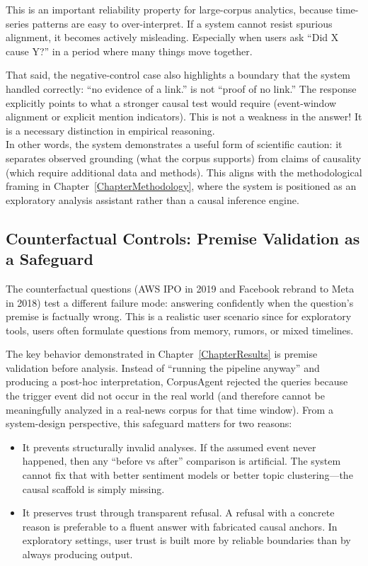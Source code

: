 This is an important reliability property for large-corpus analytics, because time-series patterns are easy to over-interpret. If a system cannot resist spurious alignment, it becomes actively misleading. Especially when users ask “Did X cause Y?” in a period where many things move together.

That said, the negative-control case also highlights a boundary that the system handled correctly: “no evidence of a link.” is not “proof of no link.” The response explicitly points to what a stronger causal test would require (event-window alignment or explicit mention indicators). This is not a weakness in the answer! It is a necessary distinction in empirical reasoning. \\
In other words, the system demonstrates a useful form of scientific caution: it separates observed grounding (what the corpus supports) from claims of causality (which require additional data and methods). This aligns with the methodological framing in Chapter~\ref{ChapterMethodology}, where the system is positioned as an exploratory analysis assistant rather than a causal inference engine.

\subsection{Counterfactual Controls: Premise Validation as a Safeguard}

The counterfactual questions (AWS IPO in 2019 and Facebook rebrand to Meta in 2018) test a different failure mode: answering confidently when the question’s premise is factually wrong. This is a realistic user scenario since for exploratory tools, users often formulate questions from memory, rumors, or mixed timelines.

The key behavior demonstrated in Chapter~\ref{ChapterResults} is premise validation before analysis. Instead of “running the pipeline anyway” and producing a post-hoc interpretation, CorpusAgent rejected the queries because the trigger event did not occur in the real world (and therefore cannot be meaningfully analyzed in a real-news corpus for that time window). From a system-design perspective, this safeguard matters for two reasons:

\begin{itemize}
    \item It prevents structurally invalid analyses. If the assumed event never happened, then any “before vs after” comparison is artificial. The system cannot fix that with better sentiment models or better topic clustering—the causal scaffold is simply missing.
    \item It preserves trust through transparent refusal. A refusal with a concrete reason is preferable to a fluent answer with fabricated causal anchors. In exploratory settings, user trust is built more by reliable boundaries than by always producing output.
\end{itemize}

